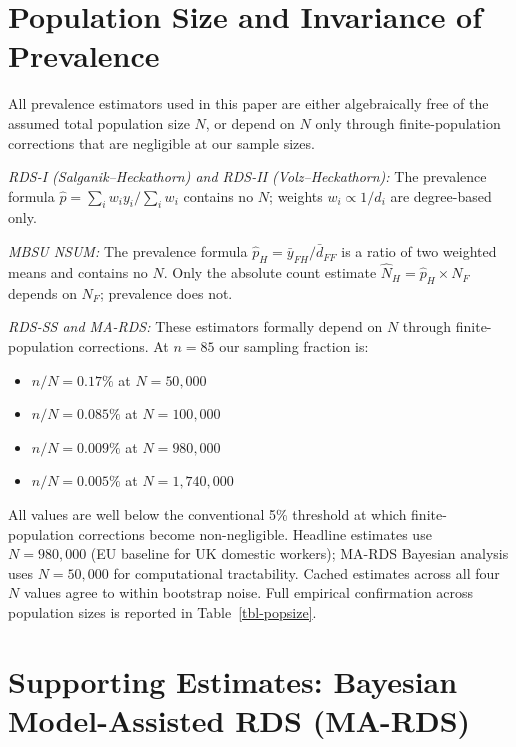 \documentclass[
  12pt,
  letterpaper,
  DIV=11,
  numbers=noendperiod]{scrreprt}
\providecommand{\tightlist}{%
  \setlength{\itemsep}{0pt}\setlength{\parskip}{0pt}}
\begin{document}
\section{Population Size and Invariance of
Prevalence}\label{sec-d-popsize}

All prevalence estimators used in this paper are either algebraically
free of the assumed total population size \(N\), or depend on \(N\) only
through finite-population corrections that are negligible at our sample
sizes.

\emph{RDS-I (Salganik--Heckathorn) and RDS-II (Volz--Heckathorn):} The
prevalence formula \(\hat{p} = \sum_i w_i y_i / \sum_i w_i\) contains no
\(N\); weights \(w_i \propto 1/d_i\) are degree-based only.

\emph{MBSU NSUM:} The prevalence formula
\(\hat{p}_H = \bar{y}_{FH}/\bar{d}_{FF}\) is a ratio of two weighted
means and contains no \(N\). Only the absolute count estimate
\(\hat{N}_H = \hat{p}_H \times N_F\) depends on \(N_F\); prevalence does
not.

\emph{RDS-SS and MA-RDS:} These estimators formally depend on \(N\)
through finite-population corrections. At \(n = 85\) our sampling
fraction is:

\begin{itemize}
\tightlist
\item
  \(n/N = 0.17\%\) at \(N = 50{,}000\)
\item
  \(n/N = 0.085\%\) at \(N = 100{,}000\)
\item
  \(n/N = 0.009\%\) at \(N = 980{,}000\)
\item
  \(n/N = 0.005\%\) at \(N = 1{,}740{,}000\)
\end{itemize}

All values are well below the conventional 5\% threshold at which
finite-population corrections become non-negligible. Headline estimates
use \(N = 980{,}000\) (EU baseline for UK domestic workers); MA-RDS
Bayesian analysis uses \(N = 50{,}000\) for computational tractability.
Cached estimates across all four \(N\) values agree to within bootstrap
noise. Full empirical confirmation across population sizes is reported
in Table~\ref{tbl-popsize}.

\section{Supporting Estimates: Bayesian Model-Assisted RDS
(MA-RDS)}\label{sec-d-ma}
\end{document}
